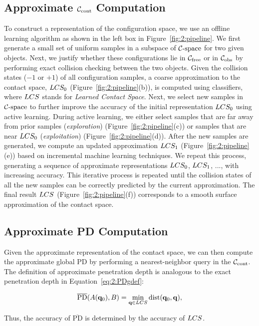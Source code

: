 \subsection{Approximate $\mathcal C_\text{cont}$ Computation}
To construct a representation of the configuration space, we use an offline learning algorithm as shown in the left box in Figure~\ref{fig:2:pipeline}. We first generate a small set of uniform samples in a subspace of $\mathcal C\text{-space}$ for two given objects. Next, we justify whether these configurations lie in $\mathcal C_{\text{free}}$ or in $\mathcal C_{\text{obs}}$ by performing exact collision checking between the two objects. Given the collision states ($-1$ or $+1$) of all configuration samples, a coarse approximation to the contact space, $LCS_0$ (Figure~\ref{fig:2:pipeline}(b)), is computed using classifiers, where $LCS$ stands for \emph{Learned Contact Space}. Next, we select new samples in $\mathcal C\text{-space}$ to further improve the accuracy of the initial representation $LCS_0$ using active learning. During active learning, we either select samples that are far away from prior samples (\emph{exploration}) (Figure~\ref{fig:2:pipeline}(c)) or samples that are near $LCS_0$ (\emph{exploitation}) (Figure~\ref{fig:2:pipeline}(d)).
After the new samples are generated, we compute an updated
approximation $LCS_1$ (Figure~\ref{fig:2:pipeline}(e)) based on incremental
machine learning techniques. We repeat this process, generating a sequence of approximate representations
$LCS_0$, $LCS_1$, ..., with increasing accuracy. This iterative process is repeated until the
collision states of all the new samples can be correctly
predicted by the current approximation. The final result $LCS$
(Figure~\ref{fig:2:pipeline}(f)) corresponds to a smooth surface approximation of the contact space.

\subsection{Approximate PD Computation}
Given the approximate representation of the contact space, we can
then compute the approximate global PD by performing a nearest-neighbor query in the $\mathcal C_\text{cont}$.
The definition of approximate penetration depth is analogous to the exact penetration depth in Equation~\ref{eq:2:PDgdef}:

\begin{align}
\label{eq:2:PDsdef} \overline{\text{PD}}(A(\mathbf q_0), B) = \min_{\mathbf q \in LCS}\operatorname{dist}(\mathbf q_0, \mathbf q),
\end{align}

Thus, the accuracy of $\overline{\text{PD}}$ is determined by the accuracy of $LCS$.


